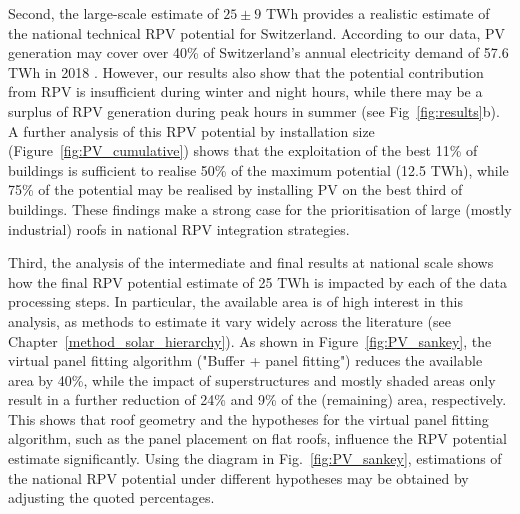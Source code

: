 Second, the large-scale estimate of $25 \pm 9$ TWh provides a realistic estimate of the national technical RPV potential for Switzerland. 
According to our data, PV generation may cover over 40\% of Switzerland's annual electricity demand of 57.6 TWh in 2018 \cite{swiss_federal_institue_for_energy_schweizerische_2018}. 
However, our results also show that the potential contribution from RPV is insufficient during winter and night hours, while there may be a surplus of RPV generation during peak hours in summer (see Fig~\ref{fig:results}b). 
A further analysis of this RPV potential by installation size (Figure~\ref{fig:PV_cumulative}) shows that the exploitation of the best 11\% of buildings is sufficient to realise 50\% of the maximum potential (12.5 TWh), while 75\% of the potential may be realised by installing PV on the best third of buildings. 
These findings make a strong case for the prioritisation of large (mostly industrial) roofs in national RPV integration strategies.

Third, the analysis of the intermediate and final results at national scale shows how the final RPV potential estimate of 25 TWh is impacted by each of the data processing steps. In particular, the available area is of high interest in this analysis, as methods to estimate it vary widely across the literature (see Chapter~\ref{method_solar_hierarchy}).
As shown in Figure~\ref{fig:PV_sankey}, the virtual panel fitting algorithm ("Buffer + panel fitting") reduces the available area by 40\%, while the impact of superstructures and mostly shaded areas only result in a further reduction of 24\% and 9\% of the (remaining) area, respectively. 
This shows that roof geometry and the hypotheses for the virtual panel fitting algorithm, such as the panel placement on flat roofs, influence the RPV potential estimate significantly.
Using the diagram in Fig.~\ref{fig:PV_sankey}, estimations of the national RPV potential under different hypotheses may be obtained by adjusting the quoted percentages.


